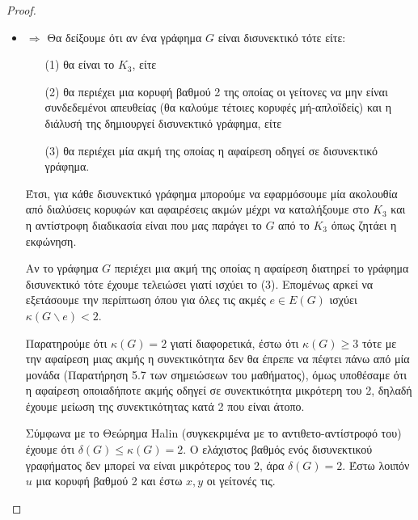 \documentclass[a4paper, oneside, 11pt]{article}
\begin{document}
\begin{enumerate}
\begin{proof}
\begin{itemize}
            \item $\Rightarrow$
               Θα δείξουμε ότι αν ένα γράφημα $G$ είναι δισυνεκτικό τότε
               είτε:
               \begin{enumerate}
               \item[(1)] θα είναι το $K_3$, είτε
               \item[(2)] θα περιέχει μια κορυφή
               βαθμού 2 της οποίας οι γείτονες να μην είναι συνδεδεμένοι
               απευθείας
               (θα καλούμε τέτοιες κορυφές μή-απλοϊδείς) και η διάλυσή
               της δημιουργεί δισυνεκτικό γράφημα, είτε
               \item[(3)] θα περιέχει
               μία ακμή της οποίας η αφαίρεση οδηγεί σε δισυνεκτικό
               γράφημα.
               \end{enumerate}

               Έτσι, για κάθε δισυνεκτικό γράφημα μπορούμε να εφαρμόσουμε
               μία ακολουθία από διαλύσεις κορυφών και αφαιρέσεις ακμών
               μέχρι να καταλήξουμε στο $K_3$ και η αντίστροφη διαδικασία
               είναι που μας παράγει το $G$ από το $K_3$ όπως ζητάει η
               εκφώνηση.

               Αν το γράφημα $G$ περιέχει μια ακμή της οποίας η αφαίρεση
               διατηρεί το γράφημα δισυνεκτικό τότε έχουμε τελειώσει γιατί
               ισχύει το (3). Επομένως αρκεί να εξετάσουμε την περίπτωση
               όπου για όλες τις ακμές $e \in E(G)$ ισχύει
               $\kappa(G \backslash e) < 2$.

               Παρατηρούμε ότι $\kappa(G) = 2$ γιατί διαφορετικά, έστω
               ότι $\kappa(G) \geq 3$ τότε με την αφαίρεση μιας ακμής
               η συνεκτικότητα δεν θα έπρεπε να πέφτει πάνω από μία
               μονάδα (Παρατήρηση 5.7 των σημειώσεων του μαθήματος),
               όμως υποθέσαμε ότι η αφαίρεση οποιαδήποτε ακμής
               οδηγεί σε συνεκτικότητα μικρότερη του 2, δηλαδή έχουμε
               μείωση της συνεκτικότητας κατά 2 που είναι άτοπο.

               Σύμφωνα με το Θεώρημα Halin (συγκεκριμένα με το
               αντιθετο-αντίστροφό του) έχουμε ότι $\delta(G) \leq \kappa(G)
               = 2$. Ο ελάχιστος βαθμός ενός δισυνεκτικού γραφήματος
               δεν μπορεί να είναι μικρότερος του 2, άρα $\delta(G) = 2$.
               Έστω λοιπόν $u$ μια κορυφή βαθμού 2 και έστω $x, y$ οι
               γείτονές τις.


\end{itemize}
\end{proof}
\end{enumerate}
\end{document}
